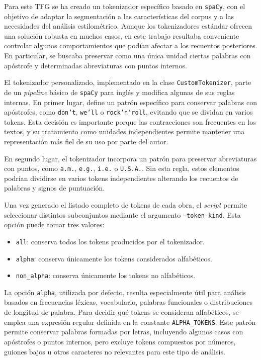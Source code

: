 \documentclass[IB]{TFUOC}%
\begin{document}
Para este TFG se ha creado un tokenizador específico basado en \texttt{spaCy}\cite{spacy2026}, con el objetivo de adaptar la segmentación a las características del corpus y a las necesidades del análisis estilométrico. Aunque los tokenizadores estándar ofrecen una solución robusta en muchos casos, en este trabajo resultaba conveniente controlar algunos comportamientos que podían afectar a los recuentos posteriores. En particular, se buscaba preservar como una única unidad ciertas palabras con apóstrofe y determinadas abreviaturas con puntos internos.

El tokenizador personalizado, implementado en la clase \texttt{CustomTokenizer}, parte de un \textit{pipeline} básico de \texttt{spaCy} para inglés y modifica algunas de sus reglas internas. En primer lugar, define un patrón específico para conservar palabras con apóstrofes, como \texttt{don't}, \texttt{we'll} o \texttt{rock'n'roll}, evitando que se dividan en varios tokens. Esta decisión es importante porque las contracciones son frecuentes en los textos, y su tratamiento como unidades independientes permite mantener una representación más fiel de su uso por parte del autor.

En segundo lugar, el tokenizador incorpora un patrón para preservar abreviaturas con puntos, como \texttt{a.m.}, \texttt{e.g.}, \texttt{i.e.} o \texttt{U.S.A.}. Sin esta regla, estos elementos podrían dividirse en varios tokens independientes alterando los recuentos de palabras y signos de puntuación.

Una vez generado el listado completo de tokens de cada obra, el \textit{script} permite seleccionar distintos subconjuntos mediante el argumento \texttt{--token-kind}. Esta opción puede tomar tres valores:

\begin{itemize}
    \item \texttt{all}: conserva todos los tokens producidos por el tokenizador.
    \item \texttt{alpha}: conserva únicamente los tokens considerados alfabéticos.
    \item \texttt{non\_alpha}: conserva únicamente los tokens no alfabéticos.
\end{itemize}

La opción \texttt{alpha}, utilizada por defecto, resulta especialmente útil para análisis basados en frecuencias léxicas, vocabulario, palabras funcionales o distribuciones de longitud de palabra. Para decidir qué tokens se consideran alfabéticos, se emplea una expresión regular definida en la constante \texttt{ALPHA\_TOKENS}. Este patrón permite conservar palabras formadas por letras, incluyendo algunos casos con apóstrofes o puntos internos, pero excluye tokens compuestos por números, guiones bajos u otros caracteres no relevantes para este tipo de análisis.
\end{document}
